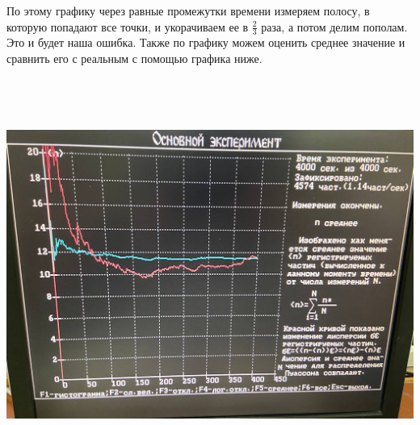 По этому графику через равные промежутки времени измеряем полосу, в которую попадают все точки, и  укорачиваем ее в $\frac{2}{3}$ раза, а потом делим пополам. Это и будет наша ошибка. Также по графику можем оценить среднее значение и сравнить его с реальным с помощью графика ниже.
\newline
	\bigskip
	\\
	\\
	\\
	\\
	\\
		\includegraphics[width=\linewidth * 2]{2}
	
	
	
